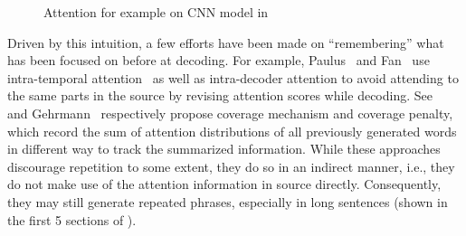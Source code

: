 \begin{figure}[th!]
\centering
{}
\quad
{}
\quad
{}
\caption{Attention for example on CNN model in }
\label{fig:attn_map}
\end{figure}

Driven by this intuition, a few efforts have been made on ``remembering''
what has been focused on before at decoding. 
For example, 
Paulus~ and 
Fan~ use intra-temporal 
attention~\cite{NallapatiZSGX16} as well as intra-decoder attention to avoid
attending to the same parts in the source by 
revising attention scores while decoding. 
See~ and Gehrmann~
respectively propose coverage mechanism and coverage penalty,
which record the sum of attention distributions of all previously generated words 
in different way
to track the summarized information.  
While these approaches discourage repetition to some extent,
they do so in an indirect manner, i.e., they do not 
make use of the attention information in source directly.
Consequently, they may still generate repeated phrases, 
especially in long sentences (shown in the first 5 sections of
).


